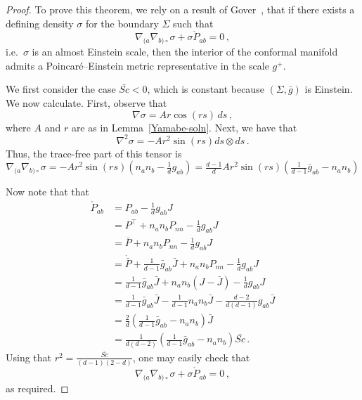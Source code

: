 \documentclass[a4paper,10.9pt]{amsart}
\theoremstyle{definition}
\theoremstyle{remark}
\newcommand{\IIo}{\hspace{0.4mm}\mathring{\rm{ I\hspace{-.2mm} I}}{\hspace{.0mm}}}
\newcommand{\IIIo}{{\mathring{{\bf\rm I\hspace{-.2mm} I \hspace{-.2mm} I}}{\hspace{.2mm}}}{}}
\newcommand{\IVo}{{\mathring{{\bf\rm I\hspace{-.2mm} V}}{\hspace{.2mm}}}{}}
\numberwithin{equation}{section}
\renewcommand{\=}{\stackrel \Sigma =}
\begin{document}
\begin{proof}
To prove this theorem, we rely on a result of Gover~\cite{Goal}, that if there exists a defining density $\sigma$ 
for the boundary $\Sigma$ such that
$$\nabla_{(a} \nabla_{b)\circ} \sigma + \sigma \mathring{P}_{ab} = 0\,,$$
i.e.\ $\sigma$ is an almost Einstein scale,
then the interior of the conformal manifold admits a Poincar\'e--Einstein metric representative in the scale $g^+$.

We first consider the case 
$\bar{Sc} < 0$, which is constant because $(\Sigma,\bar{g})$ is Einstein. We now calculate. First, observe that
$$\nabla \sigma = Ar \cos (rs) \, ds\,,$$
where $A$ and $r$ are as in Lemma~\ref{Yamabe-soln}. Next, we have that
$$\nabla^2 \sigma = -Ar^2 \sin (rs) ds \otimes ds\,.$$
Thus, the trace-free part of this tensor is
$$\nabla_{(a} \nabla_{b)\circ} \sigma = -Ar^2 \sin(rs) (n_a n_b - \tfrac{1}{d} g_{ab}) =  \tfrac{d-1}{d} Ar^2 \sin(rs) (\tfrac{1}{d-1} \bar{g}_{ab} - n_a n_b)$$

Now note that that
\begin{align*}
\mathring{P}_{ab} &= P_{ab} - \tfrac{1}{d} g_{ab} J \\
&= P^\top +n_a n_b P_{nn} - \tfrac{1}{d} {g}_{ab} J\\
&= \bar{P} + n_a n_b P_{nn} - \tfrac{1}{d} g_{ab} J  \\
&= \mathring{\bar{P}} + \tfrac{1}{d-1} \bar{g}_{ab} \bar{J} + n_a n_b P_{nn} - \tfrac{1}{d} g_{ab} J  \\
&=  \tfrac{1}{d-1} \bar{g}_{ab} \bar{J} + n_a n_b (J-\bar{J}) - \tfrac{1}{d} g_{ab} J \\
&= \tfrac{1}{d-1} \bar{g}_{ab} \bar{J} - \tfrac{1}{d-1} n_a n_b \bar{J} - \tfrac{d-2}{d(d-1)} g_{ab} \bar{J} \\
&= \tfrac{2}{d}\left(\tfrac{1}{d-1} \bar{g}_{ab} -  n_a n_b \right) \bar{J} \\
&= \tfrac{1}{d(d-2)}\left(\tfrac{1}{d-1} \bar{g}_{ab} -  n_a n_b \right) \bar{Sc}\,.
\end{align*}
Using that $r^2 = \frac{\bar{Sc}}{(d-1)(2-d)}$, one may easily check that
$$\nabla_{(a} \nabla_{b)\circ} \sigma + \sigma \mathring{P}_{ab} = 0\,,$$
as required.


\end{proof}
\end{document}
